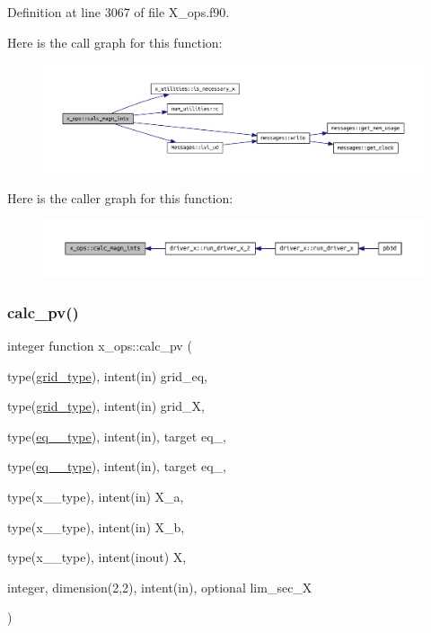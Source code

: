Definition at line 3067 of file X\+\_\+ops.\+f90.

Here is the call graph for this function\+:\nopagebreak
\begin{figure}[H]
\begin{center}
\leavevmode
\includegraphics[width=350pt]{namespacex__ops_a6df79622d1b95d54ab3e542751a5881d_cgraph}
\end{center}
\end{figure}
Here is the caller graph for this function\+:\nopagebreak
\begin{figure}[H]
\begin{center}
\leavevmode
\includegraphics[width=350pt]{namespacex__ops_a6df79622d1b95d54ab3e542751a5881d_icgraph}
\end{center}
\end{figure}
\mbox{\label{namespacex__ops_a51f3bf0b4c8d688ffbcc3a1adbca9762}} 
\subsubsection{\texorpdfstring{calc\+\_\+pv()}{calc\_pv()}}
{\footnotesize\ttfamily integer function x\+\_\+ops\+::calc\+\_\+pv (\begin{DoxyParamCaption}\item[{type(\hyperlink{structgrid__vars_1_1grid__type}{grid\+\_\+type}), intent(in)}]{grid\+\_\+eq,  }\item[{type(\hyperlink{structgrid__vars_1_1grid__type}{grid\+\_\+type}), intent(in)}]{grid\+\_\+X,  }\item[{type(\hyperlink{structeq__vars_1_1eq__1__type}{eq\+\_\+1\+\_\+type}), intent(in), target}]{eq\+\_,  }\item[{type(\hyperlink{structeq__vars_1_1eq__2__type}{eq\+\_\+2\+\_\+type}), intent(in), target}]{eq\+\_,  }\item[{type(x\+\_\+1\+\_\+type), intent(in)}]{X\+\_\+a,  }\item[{type(x\+\_\+1\+\_\+type), intent(in)}]{X\+\_\+b,  }\item[{type(x\+\_\+2\+\_\+type), intent(inout)}]{X,  }\item[{integer, dimension(2,2), intent(in), optional}]{lim\+\_\+sec\+\_\+X }\end{DoxyParamCaption})}



